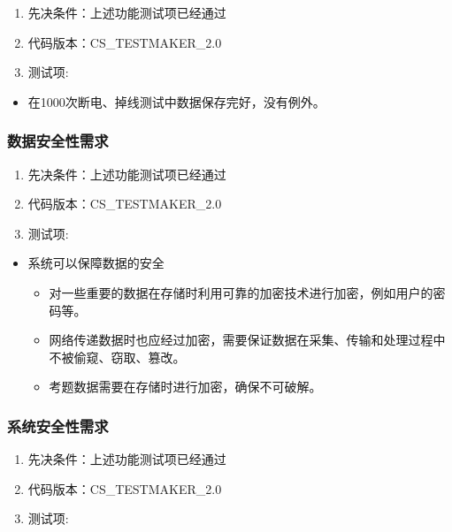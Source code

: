\documentclass[hyperref, a4paper]{ctexart}
\providecommand{\tightlist}{%
  \setlength{\itemsep}{0pt}\setlength{\parskip}{0pt}}
\begin{document}
\begin{enumerate}
\def\labelenumi{\arabic{enumi}.}
\tightlist
\item
  先决条件：上述功能测试项已经通过
\item
  代码版本：CS\_TESTMAKER\_2.0
\item
  测试项:
\end{enumerate}

\begin{itemize}
\tightlist
\item
  在1000次断电、掉线测试中数据保存完好，没有例外。
\end{itemize}

\hypertarget{ux6570ux636eux5b89ux5168ux6027ux9700ux6c42}{%
\subsubsection{数据安全性需求}\label{ux6570ux636eux5b89ux5168ux6027ux9700ux6c42}}

\begin{enumerate}
\def\labelenumi{\arabic{enumi}.}
\tightlist
\item
  先决条件：上述功能测试项已经通过
\item
  代码版本：CS\_TESTMAKER\_2.0
\item
  测试项:
\end{enumerate}

\begin{itemize}
\tightlist
\item
  系统可以保障数据的安全

  \begin{itemize}
  \tightlist
  \item
    对一些重要的数据在存储时利用可靠的加密技术进行加密，例如用户的密码等。
  \item
    网络传递数据时也应经过加密，需要保证数据在采集、传输和处理过程中不被偷窥、窃取、篡改。
  \item
    考题数据需要在存储时进行加密，确保不可破解。
  \end{itemize}
\end{itemize}

\hypertarget{ux7cfbux7edfux5b89ux5168ux6027ux9700ux6c42}{%
\subsubsection{系统安全性需求}\label{ux7cfbux7edfux5b89ux5168ux6027ux9700ux6c42}}

\begin{enumerate}
\def\labelenumi{\arabic{enumi}.}
\tightlist
\item
  先决条件：上述功能测试项已经通过
\item
  代码版本：CS\_TESTMAKER\_2.0
\item
  测试项:
\end{enumerate}
\end{document}
